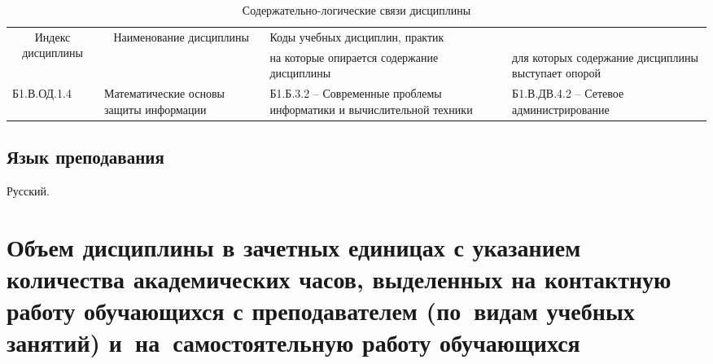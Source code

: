 \documentclass[a4paper,12pt]{article}
\begin{document}
  \begin{table}[H]
  \setlength\arraycolsep{3pt}
  \caption{Содержательно-логические связи дисциплины}
  \begin{tabular}{|l|p{18ex}|*{2}{p{23ex}|}}
  \hline
  \multicolumn{1}{|c|}{\multirow{2}{13ex}{\centering Индекс \linebreak дисциплины}} &
  \multicolumn{1}{c|}{\multirow{2}{18ex}{\centering Наименование \linebreak дисциплины}} & 
  \multicolumn{2}{p{46ex}|}{\centering Коды учебных дисциплин, практик} \\
  \cline{3-4}
   & & 
  \centering на которые опирается содержание дисциплины & 
  \centering\arraybackslash для которых содержание дисциплины выступает опорой
  \\ \hline
  Б1.В.ОД.1.4 & Математические основы защиты информации 
  & 
  Б1.Б.3.2 -- Современные проблемы информатики и вычислительной техники 
  & 
  \raggedright\arraybackslash
  Б1.В.ДВ.4.2 -- Сетевое администрирование
  \\ \hline
  \end{tabular}
  \end{table}


\subsection{Язык преподавания} 
  Русский.
  



\newpage

\section{Объем дисциплины в зачетных единицах с указанием количества академических часов, выделенных на контактную работу обучающихся с преподавателем (по~видам учебных занятий) и~на~самостоятельную работу обучающихся}
\end{document}
